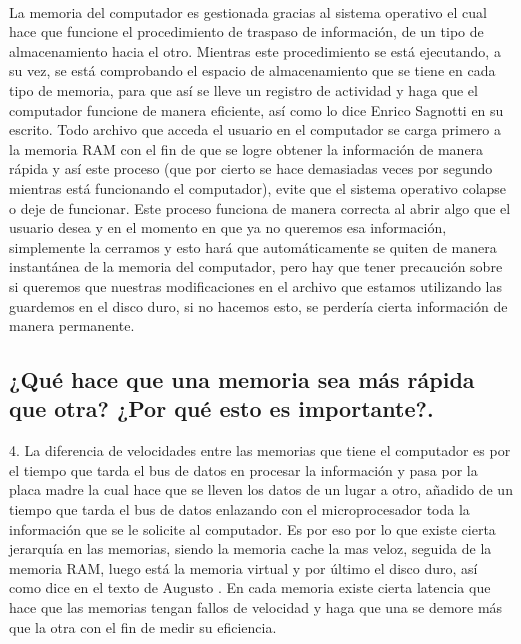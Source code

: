 \documentclass{article}
\begin{document}
\paragraph{}
La memoria del computador es gestionada gracias al sistema operativo el cual hace que funcione el procedimiento de traspaso de información, de un tipo de almacenamiento hacia el otro. Mientras este procedimiento se está ejecutando, a su vez, se está comprobando el espacio de almacenamiento que se tiene en cada tipo de memoria, para que así se lleve un registro de actividad y haga que el computador funcione de manera eficiente, así como lo dice Enrico Sagnotti en su escrito\cite{memoria}. Todo archivo que acceda el usuario en el computador se carga primero a la memoria RAM con el fin de que se logre obtener la información de manera rápida y así este proceso (que por cierto se hace demasiadas veces por segundo mientras está funcionando el computador), evite que el sistema operativo colapse o deje de funcionar. Este proceso funciona de manera correcta al abrir algo que el usuario desea y en el momento en que ya no queremos esa información, simplemente la cerramos y esto hará que automáticamente se quiten de manera instantánea de la memoria del computador, pero hay que tener precaución sobre si queremos que nuestras modificaciones en el archivo que estamos utilizando las guardemos en el disco duro, si no hacemos esto, se perdería cierta información de manera permanente.

\paragraph{}
\subsection{¿Qué hace que una memoria sea más rápida que otra? ¿Por qué esto es importante?.}
4.	La diferencia de velocidades entre las memorias que tiene el computador es por el tiempo que tarda el bus de datos en procesar la información y pasa por la placa madre la cual hace que se lleven los datos de un lugar a otro, añadido de un tiempo que tarda el bus de datos enlazando con el microprocesador toda la información que se le solicite al computador. Es por eso por lo que existe cierta jerarquía en las memorias, siendo la memoria cache la mas veloz, seguida de la memoria RAM, luego está la memoria virtual y por último el disco duro, así como dice en el texto de Augusto \cite{documento}. En cada memoria existe cierta latencia que hace que las memorias tengan fallos de velocidad y haga que una se demore más que la otra con el fin de medir su eficiencia.
\end{document}
